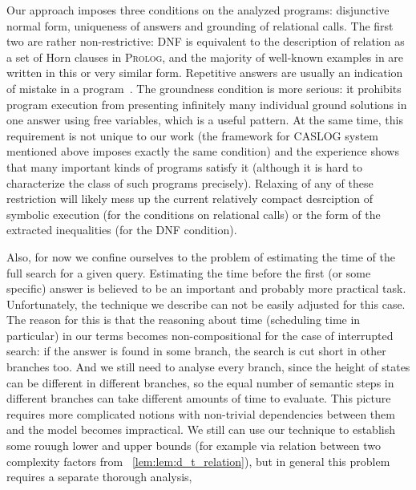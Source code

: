 Our approach imposes three conditions on the analyzed programs: disjunctive normal form, uniqueness of answers and grounding of relational calls.
The first two are rather non-restrictive: DNF is equivalent to the description of relation as a set of Horn clauses in \textsc{Prolog},
and the majority of well-known examples in \mK are written in this or very similar form. Repetitive answers are usually an indication
of mistake in a program~\cite{WillsThesis}. The groundness condition is more serious: it prohibits program execution from presenting infinitely
many individual ground solutions in one answer using free variables, which is a useful pattern. At the same time, this requirement is
not unique to our work (the framework for \textsc{CASLOG} system mentioned above imposes exactly the same condition) and the experience
shows that many important kinds of programs satisfy it (although it is hard to characterize the class of such programs precisely).
Relaxing of any of these restriction will likely mess up the current relatively compact desrciption of symbolic execution (for
the conditions on relational calls) or the form of the extracted inequalities (for the DNF condition).

Also, for now we confine ourselves to the problem of estimating the time of the full search for a given query. Estimating the time before
the first (or some specific) answer is believed to be an important and probably more practical task. Unfortunately, the technique we describe
can not be easily adjusted for this case. The reason for this is that the reasoning about time (scheduling time in particular) in our
terms becomes non-compositional for the case of interrupted search: if the answer is found in some branch, the search is cut short in
other branches too. And we still need to analyse every branch, since the height of states can be different in different branches, so
the equal number of semantic steps in different branches can take different amounts of time to evaluate. This picture requires more
complicated notions with non-trivial dependencies between them and the model becomes impractical. We still can use our technique
to establish some rouugh lower and upper bounds (for example via relation between two complexity factors from \lemmaword~\ref{lem:lem:d_t_relation}),
but in general this problem requires a separate thorough analysis,

